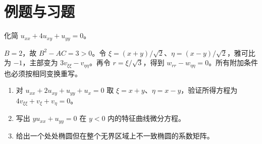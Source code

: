 \section{例题与习题}
\begin{example}
化简 $u_{xx}+4u_{xy}+u_{yy}=0$。
\end{example}
\begin{solve}
$B=2$，故 $B^2-AC=3>0$。令 $\xi=(x+y)/\sqrt2$、$\eta=(x-y)/\sqrt2$，雅可比为 $-1$，主部变为 $3v_{\xi\xi}-v_{\eta\eta}$。再令 $r=\xi/\sqrt3$，得到 $w_{rr}-w_{\eta\eta}=0$。所有附加条件也必须按相同变换重写。
\end{solve}
\begin{enumerate}
 \item 对 $u_{xx}+2u_{xy}+u_{yy}+u_x=0$ 取 $\xi=x+y$、$\eta=x-y$，验证所得方程为 $4v_{\xi\xi}+v_\xi+v_\eta=0$。
 \item 写出 $y u_{xx}+u_{yy}=0$ 在 $y<0$ 内的特征曲线微分方程。
 \item 给出一个处处椭圆但在整个无界区域上不一致椭圆的系数矩阵。
\end{enumerate}

